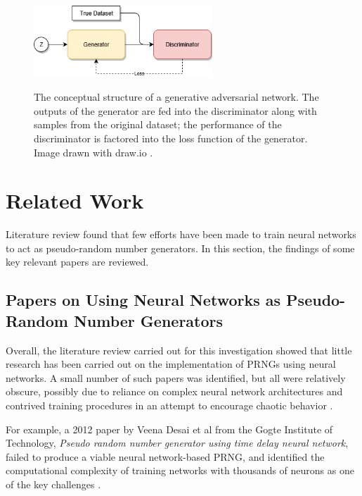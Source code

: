 \documentclass[12pt, titlepage]{report}
\theoremstyle{definition}
\begin{document}
\begin{figure}
    \centering
    \includegraphics[width=0.6\textwidth]{img/gan.png}\\
    \caption{The conceptual structure of a generative adversarial network. The outputs of the generator are fed into the discriminator along with samples from the original dataset; the performance of the discriminator is factored into the loss function of the generator. Image drawn with draw.io \cite{jgraph2018draw}.}
    \label{figure:gan}
\end{figure}



\section{Related Work}\label{section:related_work}
Literature review found that few efforts have been made to train neural networks to act as pseudo-random number generators. In this section, the findings of some key relevant papers are reviewed.



\subsection{Papers on Using Neural Networks as Pseudo-Random Number Generators}
Overall, the literature review carried out for this investigation showed that little research has been carried out on the implementation of PRNGs using neural networks. A small number of such papers was identified, but all were relatively obscure, possibly due to reliance on complex neural network architectures and contrived training procedures in an attempt to encourage chaotic behavior \cite{desai2011pseudo} \cite{desai2012pseudo} \cite{tirdad2010hopfield} \cite{wen2014exponential}.

For example, a 2012 paper by Veena Desai et al from the Gogte Institute of Technology, \textit{Pseudo random number generator using time delay neural network}, failed to produce a viable neural network-based PRNG, and identified the computational complexity of training networks with thousands of neurons as one of the key challenges \cite{desai2012pseudo}.
\end{document}
